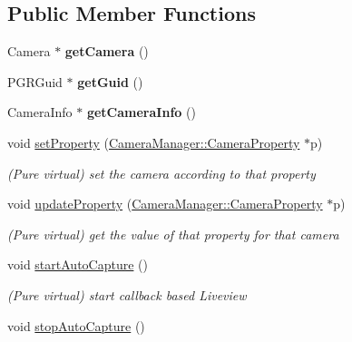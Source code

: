 \subsection*{Public Member Functions}
\begin{DoxyCompactItemize}
\item 
\hypertarget{class_fly_camera_a3176768aac0905151237c2e9633c8c47}{Camera $\ast$ {\bfseries get\-Camera} ()}\label{class_fly_camera_a3176768aac0905151237c2e9633c8c47}

\item 
\hypertarget{class_fly_camera_ae5b32f2f930f8903fde35a5aeeb059b6}{P\-G\-R\-Guid $\ast$ {\bfseries get\-Guid} ()}\label{class_fly_camera_ae5b32f2f930f8903fde35a5aeeb059b6}

\item 
\hypertarget{class_fly_camera_abfba126bfff4fee7042710451b198286}{Camera\-Info $\ast$ {\bfseries get\-Camera\-Info} ()}\label{class_fly_camera_abfba126bfff4fee7042710451b198286}

\item 
void \hyperlink{class_fly_camera_ad9d4102cab167f0d5739b2af808c43ee}{set\-Property} (\hyperlink{class_camera_manager_1_1_camera_property}{Camera\-Manager\-::\-Camera\-Property} $\ast$p)
\begin{DoxyCompactList}\small\item\em (Pure virtual) set the camera according to that property \end{DoxyCompactList}\item 
void \hyperlink{class_fly_camera_a8f87a0d8ccbee558e629189e2c8ab271}{update\-Property} (\hyperlink{class_camera_manager_1_1_camera_property}{Camera\-Manager\-::\-Camera\-Property} $\ast$p)
\begin{DoxyCompactList}\small\item\em (Pure virtual) get the value of that property for that camera \end{DoxyCompactList}\item 
\hypertarget{class_fly_camera_aa91c2cd580029a1fb242e2d8dace33b7}{void \hyperlink{class_fly_camera_aa91c2cd580029a1fb242e2d8dace33b7}{start\-Auto\-Capture} ()}\label{class_fly_camera_aa91c2cd580029a1fb242e2d8dace33b7}

\begin{DoxyCompactList}\small\item\em (Pure virtual) start callback based Liveview \end{DoxyCompactList}\item 
\hypertarget{class_fly_camera_a7d637bd9237fae3ee3cd55b044ec80f1}{void \hyperlink{class_fly_camera_a7d637bd9237fae3ee3cd55b044ec80f1}{stop\-Auto\-Capture} ()}\label{class_fly_camera_a7d637bd9237fae3ee3cd55b044ec80f1}


\end{DoxyCompactItemize}

